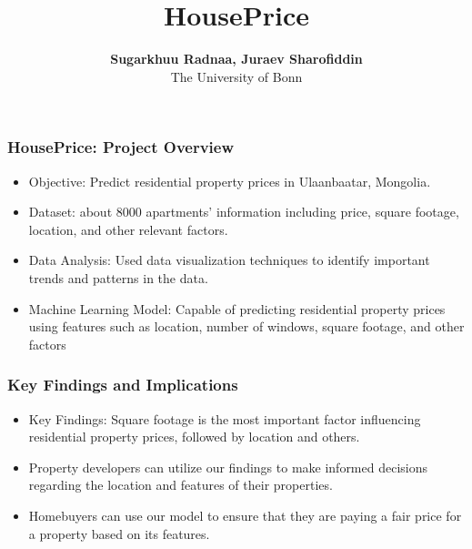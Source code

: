 \documentclass[11pt, aspectratio=169]{beamer}
\begin{document}
\title{HousePrice}

\author[Sugarkhuu Radnaa, Juraev Sharofiddin]
{
{\bf Sugarkhuu Radnaa, Juraev Sharofiddin}\\
{\small The University of Bonn}\\[1ex]
}


\begin{frame}
    \titlepage
    \note{~}
\end{frame}


\begin{frame}[t]
    \frametitle{HousePrice: Project Overview}
    \begin{itemize}
        \item Objective: Predict residential property prices in Ulaanbaatar, Mongolia.
        \item Dataset: about 8000 apartments' information including price, square footage, location, and other relevant factors.
        \item Data Analysis: Used data visualization techniques to identify important trends and patterns in the data.
        \item Machine Learning Model: Capable of predicting residential property prices using features such as location, number of windows, square footage, and other factors
    \end{itemize}
    \note{~}
\end{frame}

\begin{frame}[t]
    \frametitle{Key Findings and Implications}
    \begin{itemize}
        \item Key Findings: Square footage is the most important factor influencing residential property prices, followed by location and others.
        \item Property developers can utilize our findings to make informed decisions regarding the location and features of their properties.
        \item Homebuyers can use our model to ensure that they are paying a fair price for a property based on its features.
    \end{itemize}
\end{frame}
\end{document}

